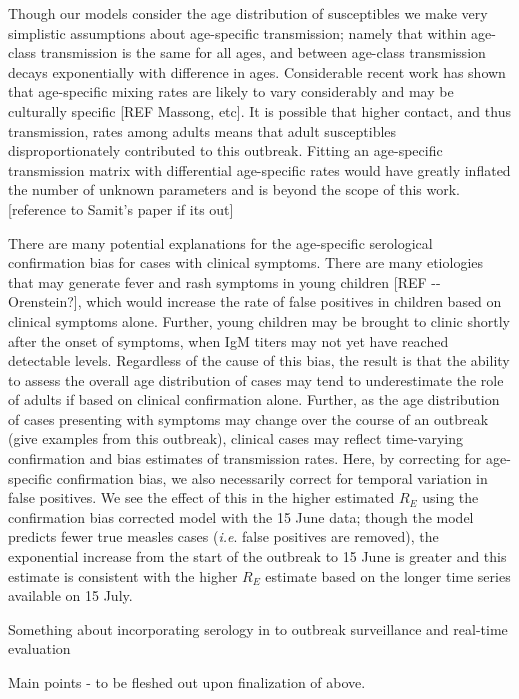 Though our models consider the age distribution of susceptibles we make
very simplistic assumptions about age-specific transmission; namely that
within age-class transmission is the same for all ages, and between
age-class transmission decays exponentially with difference in ages.
Considerable recent work has shown that age-specific mixing rates are
likely to vary considerably and may be culturally specific  {[}REF
Massong, etc{]}. It is possible that higher contact, and thus
transmission, rates among adults means that adult susceptibles
disproportionately contributed to this outbreak. Fitting an age-specific
transmission matrix with differential age-specific rates would have
greatly inflated the number of unknown parameters and is beyond the
scope of this work. {[}reference to Samit's paper if its out{]}

There are many potential explanations for the age-specific serological
confirmation bias for cases with clinical symptoms. There are many
etiologies that may generate fever and rash symptoms in young children
{[}REF -\/- Orenstein?{]}, which would increase the rate of false
positives in children based on clinical symptoms alone. Further, young
children may be brought to clinic shortly after the onset of symptoms,
when IgM titers may not yet have reached detectable levels. Regardless
of the cause of this bias, the result is that the ability to assess the
overall age distribution of cases may tend to underestimate the role of
adults if based on clinical confirmation alone. Further, as the age
distribution of cases presenting with symptoms may change over the
course of an outbreak (give examples from this outbreak), clinical cases
may reflect time-varying confirmation and bias estimates of transmission
rates. Here, by correcting for age-specific confirmation bias, we also
necessarily correct for temporal variation in false positives. We see
the effect of this in the higher estimated \(R_E\) using the confirmation
bias corrected model with the 15 June data; though the model predicts
fewer true measles cases (\emph{i.e}. false positives are removed), the
exponential increase from the start of the outbreak to 15 June is
greater and this estimate is consistent with the higher \(R_E\) estimate
based on the longer time series available on 15 July.

Something about incorporating serology in to outbreak surveillance and
real-time evaluation

Main points - to be fleshed out upon finalization of above.

